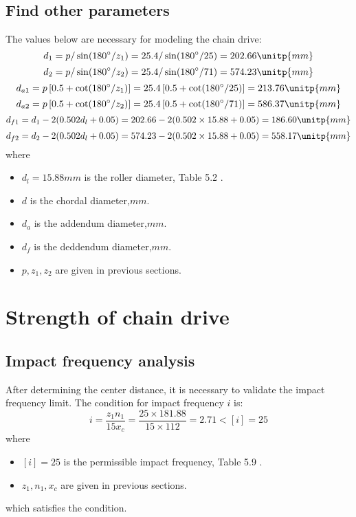 \subsection{Find other parameters} The values below are necessary for modeling the chain drive:\\ 
\[d_1 = p/\sin (180^\circ/z_1) = 25.4/\sin (180^\circ/25) = 202.66\unitp{mm}\]
\[d_2 = p/\sin (180^\circ/z_2) = 25.4/\sin (180^\circ/71) = 574.23\unitp{mm}\]
\[d_{a1} = p \left[ 0.5 + \cot (180^\circ/z_1) \right] = 25.4 \left[ 0.5 + \cot (180^\circ/25) \right] = 213.76 \unitp{mm}\]
\[d_{a2} = p \left[ 0.5 + \cot (180^\circ/z_2) \right] = 25.4 \left[ 0.5 + \cot (180^\circ/71) \right] =  586.37 \unitp{mm}\]
\[d_{f1} = d_1 - 2(0.502 d_l+0.05) = 202.66 - 2(0.502\times 15.88+ 0.05) = 186.60 \unitp{mm}\]
\[d_{f2} = d_2 - 2(0.502 d_l+0.05) = 574.23 - 2(0.502\times 15.88+ 0.05) = 558.17 \unitp{mm}\]
where 
\begin{itemize}
	\item $ d_l=15.88\unit{mm} $ is the roller diameter, Table 5.2 \cite{tk1}.
	\item $ d $ is the chordal diameter,$ \unit{mm} $.
	\item $ d_a $ is the addendum diameter,$ \unit{mm} $.
	\item $ d_f $ is the deddendum diameter,$ \unit{mm} $.
	\item $ p,z_1,z_2 $ are given in previous sections.
\end{itemize}
\section{Strength of chain drive}
\subsection{Impact frequency analysis}
After determining the center distance, it is necessary to validate the impact frequency limit. The condition for impact frequency $ i $ is:
\[i=\dfrac{z_1n_1}{15x_c}=\dfrac{25\times 181.88}{15\times 112}=2.71<[i]=25\]
where
\begin{itemize}
	\item $ [i]=25 $ is the permissible impact frequency, Table 5.9 \cite{tk1}.
	\item $ z_1,n_1,x_c $ are given in previous sections.
\end{itemize}
which satisfies the condition.

